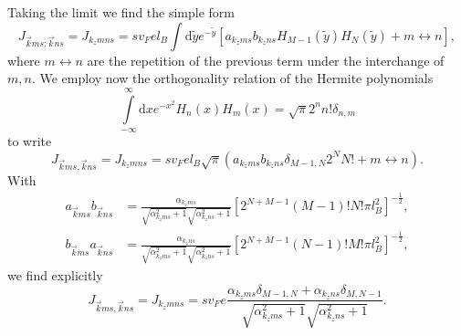 Taking the limit we find the simple form
\begin{equation}
  \label{eq:74}
  J_{\vec{k} m s; \vec{k} n s} = J_{k_z m n s} =
  s v_F e l_B \int \mathrm{d}\tilde{y} e^{-\tilde{y} }
  \left[
    a_{k_zms} b_{k_z n s} H_{M-1}(\tilde{y} )H_N(\tilde{y} )
    + m \leftrightarrow n
  \right],
\end{equation}
where \( m \leftrightarrow n \) are the repetition of the previous term under the interchange of \( m, n \).
We employ now the orthogonality relation of the Hermite polynomials~\cite[Table~18.3.1]{NIST:DLMF}
\begin{equation}
  \label{eq:hermite-ortho}
  \int\limits_{-\infty}^{\infty} \mathrm{d}x e^{-x^2} H_n(x)H_m(x) = \sqrt{\pi} 2^{n} n! \delta_{n,m}
\end{equation}
to write
\begin{equation}
  J_{\vec{k} m s, \vec{k} n s} = J_{k_z m n s}
  = s v_F e l_B \sqrt{\pi} (a_{k_z ms} b_{k_z n s} \delta_{M-1, N} 2^N N! + m \leftrightarrow n).
\end{equation}
With
\begin{align}
  a_{\vec{k}ms}b_{\vec{k}ns} &= 
  \frac{\alpha_{k_z ms} }{
    \sqrt{\alpha_{k_z ms}^2 +1}
    \sqrt{\alpha_{k_z ns}^2 + 1}
  }
  \left[ 2^{N+M-1} (M-1)! N! \pi l_B^2 \right]^{-\frac{1}{2}},\\
  b_{\vec{k}ms}a_{\vec{k} ns} &= 
  \frac{\alpha_{k_z ns} }{
    \sqrt{\alpha_{k_z ms}^2 +1}
    \sqrt{\alpha_{k_z ns}^2 + 1}
  }
  \left[ 2^{N+M-1} (N-1)! M! \pi l_B^2 \right]^{-\frac{1}{2}},
\end{align}
we find explicitly
\begin{equation}
  J_{\vec{k} m s, \vec{k} n s} = J_{k_z m n s} =
  s v_F e
  \frac{\alpha_{k_z m s} \delta_{M-1, N} + \alpha_{k_z n s} \delta_{M, N-1}}{\sqrt{\alpha_{k_z m s}^2 + 1} \sqrt{\alpha_{k_z n s}^2 + 1}}.
\end{equation}


